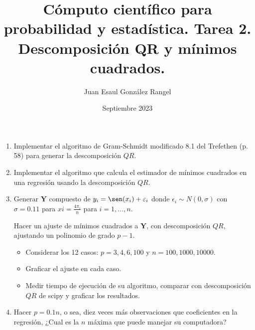 \documentclass{article}
\title{Cómputo científico para probabilidad y estadística. Tarea 2.\\
Descomposición QR y mínimos cuadrados.}
\author{Juan Esaul González Rangel}
\date{Septiembre 2023}
\begin{document}
\maketitle


\begin{enumerate}

    \item Implementar el algoritmo de Gram-Schmidt modificado 8.1 del Trefethen (p. 58) para generar la descomposición $QR$.

    \item Implementar el algoritmo que calcula el estimador de mínimos cuadrados
en una regresión usando la descomposición $QR$.

    \item Generar $\mathbf Y$ compuesto de $y_i = \sen(x_i) + \epsilon_i$ donde $\epsilon_i \sim N (0, \sigma)$ con $\sigma = 0.11$ para $xi = \frac{4\pi_i}n$ para $i = 1, \dots , n$.

    Hacer un ajuste de mínimos cuadrados a $\mathbf Y$, con descomposición $QR$, ajustando un polinomio de grado $p - 1$.

    \begin{itemize}
        \item Considerar los 12 casos: $p = 3, 4, 6, 100$ y $n = 100, 1000, 10000$.
        \item Graficar el ajuste en cada caso.
        \item Medir tiempo de ejecución de su algoritmo, comparar con descomposición $QR$ de scipy y graficar los resultados.
    \end{itemize}


    \item Hacer $p = 0.1n$, o sea, diez veces más observaciones que coeficientes en la regresión, ¿Cual es la $n$ máxima que puede manejar su computadora?
   
\end{enumerate}




 
\end{document}
